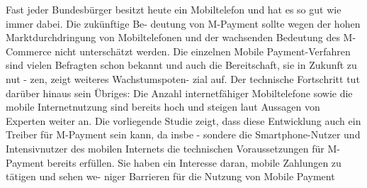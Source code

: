 Fast jeder Bundesbürger besitzt heute
ein Mobiltelefon und hat es so gut
wie immer dabei. Die zukünftige Be-
deutung von M-Payment sollte wegen
der hohen Marktdurchdringung von
Mobiltelefonen und der wachsenden
Bedeutung des M-Commerce nicht
unterschätzt werden. Die einzelnen
Mobile Payment-Verfahren sind vielen
Befragten schon bekannt und auch
die Bereitschaft, sie in Zukunft zu nut
-
zen, zeigt weiteres Wachstumspoten-
zial auf. Der technische Fortschritt
tut darüber hinaus sein Übriges: Die
Anzahl internetfähiger Mobiltelefone
sowie die mobile Internetnutzung
sind bereits hoch und steigen laut
Aussagen von Experten weiter an.
Die vorliegende Studie zeigt, dass
diese Entwicklung auch ein Treiber
für M-Payment sein kann, da insbe
-
sondere die Smartphone-Nutzer und
Intensivnutzer des mobilen Internets
die technischen Voraussetzungen
für M-Payment bereits erfüllen. Sie
haben ein Interesse daran, mobile
Zahlungen zu tätigen und sehen we-
niger Barrieren für die Nutzung von
Mobile Payment